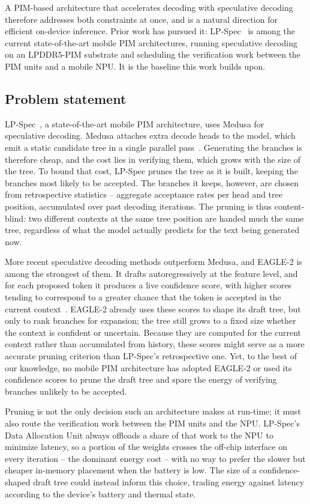\documentclass[11pt]{article}
\begin{document}
A PIM-based architecture that accelerates decoding with speculative decoding therefore addresses both constraints at once, and is a natural direction for efficient on-device inference. Prior work has pursued it: LP-Spec~\cite{he2025lpspec} is among the current state-of-the-art mobile PIM architectures, running speculative decoding on an LPDDR5-PIM substrate and scheduling the verification work between the PIM units and a mobile NPU. It is the baseline this work builds upon.

\subsection{Problem statement}
LP-Spec~\cite{he2025lpspec}, a state-of-the-art mobile PIM architecture, uses Medusa for speculative decoding. Medusa attaches extra decode heads to the model, which emit a static candidate tree in a single parallel pass~\cite{cai2024medusa}. Generating the branches is therefore cheap, and the cost lies in verifying them, which grows with the size of the tree. To bound that cost, LP-Spec prunes the tree as it is built, keeping the branches most likely to be accepted. The branches it keeps, however, are chosen from retrospective statistics -- aggregate acceptance rates per head and tree position, accumulated over past decoding iterations. The pruning is thus content-blind: two different contexts at the same tree position are handed much the same tree, regardless of what the model actually predicts for the text being generated now.

More recent speculative decoding methods outperform Medusa, and EAGLE-2 is among the strongest of them. It drafts autoregressively at the feature level, and for each proposed token it produces a live confidence score, with higher scores tending to correspond to a greater chance that the token is accepted in the current context~\cite{li2024eagle2}. EAGLE-2 already uses these scores to shape its draft tree, but only to rank branches for expansion; the tree still grows to a fixed size whether the context is confident or uncertain. Because they are computed for the current context rather than accumulated from history, these scores might serve as a more accurate pruning criterion than LP-Spec's retrospective one. Yet, to the best of our knowledge, no mobile PIM architecture has adopted EAGLE-2 or used its confidence scores to prune the draft tree and spare the energy of verifying branches unlikely to be accepted.

Pruning is not the only decision such an architecture makes at run-time; it must also route the verification work between the PIM units and the NPU. LP-Spec's Data Allocation Unit always offloads a share of that work to the NPU to minimize latency, so a portion of the weights crosses the off-chip interface on every iteration -- the dominant energy cost -- with no way to prefer the slower but cheaper in-memory placement when the battery is low. The size of a confidence-shaped draft tree could instead inform this choice, trading energy against latency according to the device's battery and thermal state.
\end{document}

